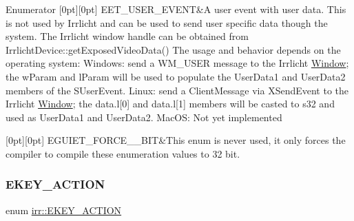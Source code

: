 \begin{DoxyEnumFields}{Enumerator}
[0pt][0pt]{}\mbox{\label{namespaceirr_ac9eed96e06e85ce3c86fcbbbe9e48a0ca4cc15ca95969a8b5d150c3d952ad06e4}} 
E\+E\+T\+\_\+\+U\+S\+E\+R\+\_\+\+E\+V\+E\+NT&A user event with user data. This is not used by Irrlicht and can be used to send user specific data though the system. The Irrlicht \textquotesingle{}window handle\textquotesingle{} can be obtained from Irrlicht\+Device\+::get\+Exposed\+Video\+Data() The usage and behavior depends on the operating system\+: Windows\+: send a W\+M\+\_\+\+U\+S\+ER message to the Irrlicht \hyperlink{classWindow}{Window}; the w\+Param and l\+Param will be used to populate the User\+Data1 and User\+Data2 members of the S\+User\+Event. Linux\+: send a Client\+Message via X\+Send\+Event to the Irrlicht \hyperlink{classWindow}{Window}; the data.\+l\mbox{[}0\mbox{]} and data.\+l\mbox{[}1\mbox{]} members will be casted to s32 and used as User\+Data1 and User\+Data2. Mac\+OS\+: Not yet implemented \\
\hline

[0pt][0pt]{}\mbox{\label{namespaceirr_ac9eed96e06e85ce3c86fcbbbe9e48a0ca736f79f0892ace68311f62939cae5678}} 
E\+G\+U\+I\+E\+T\+\_\+\+F\+O\+R\+C\+E\+\_\+\_\+\+B\+IT&This enum is never used, it only forces the compiler to compile these enumeration values to 32 bit. \\
\hline

\end{DoxyEnumFields}
\mbox{\label{namespaceirr_aa9946ac9f3142f9e790ce52d59fd6168}} 
\subsubsection{\texorpdfstring{E\+K\+E\+Y\+\_\+\+A\+C\+T\+I\+ON}{EKEY\_ACTION}}
{\footnotesize\ttfamily enum \hyperlink{namespaceirr_aa9946ac9f3142f9e790ce52d59fd6168}{irr\+::\+E\+K\+E\+Y\+\_\+\+A\+C\+T\+I\+ON}}



